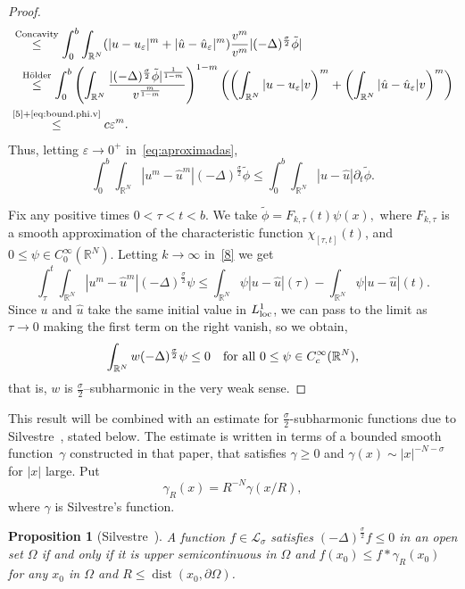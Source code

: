 \documentclass[leqno,12pt]{amsart}
\newtheorem{proposition}[theorem]{Proposition}
\theoremstyle{definition}
\theoremstyle{remark}
\numberwithin{equation}{section}
\begin{document}
\begin{proof}
\begin{align*}
    &\overset{\text{Concavity}}{\le}
    \int_{0}^{b}\int_{\mathbb{R}^N}(|u-u_{\varepsilon}|^m+|\hat{u}-\hat{u}_{\varepsilon}|^m)\frac{v^m}{v^m}|(-\Delta)^{\frac\sigma2}\tilde\phi| \\
    &\hskip6pt\overset{\text{Hölder}}{\le}\int_{0}^{b}\left(\int_{\mathbb{R}^N}\frac{|(-\Delta)^{\frac\sigma2}\tilde\phi|^{\frac{1}{1-m}}}{v^{\frac{m}{1-m}}}\right)^{1-m}
    \left(\left(\int_{\mathbb{R}^N}|u-u_{\varepsilon}|v\right)^m+\left(\int_{\mathbb{R}^N}|\hat{u}-\hat{u}_{\varepsilon}|v\right)^m\right)\\
    &\hskip-2pt\overset{\text{\eqref{5}}+\text{\eqref{eq:bound.phi.v}}}{\le} c\varepsilon^m.
\end{align*}
Thus, letting $\varepsilon\to 0^+$ in~\eqref{eq:aproximadas},
\begin{equation}\label{8}
    \int_{0}^{b}\int_{\mathbb{R}^N}|u^m-\hat{u}^m|(-\Delta)^{\frac\sigma2}\tilde{\phi}\leq \int_{0}^{b}\int_{\mathbb{R}^N}|u-\hat{u}|\partial_t\tilde{\phi}.
\end{equation}

Fix any positive times $0<\tau<t<b$. We take $\tilde{\phi}=F_{k,\tau}(t)\psi(x),$ where $F_{k,\tau}$ is a smooth approximation of the characteristic function $\chi_{[\tau,t]}(t)$, and $0\leq\psi\in C^{\infty}_0(\mathbb{R}^N)$. Letting $k\to\infty$ in~\eqref{8} we get
$$
    \int_{\tau}^{t}\int_{\mathbb{R}^N}|u^m-\hat{u}^m|(-\Delta)^{\frac\sigma2}\psi\leq \int_{\mathbb{R}^N}\psi|u-\hat{u}|(\tau) -\int_{\mathbb{R}^N}\psi|u-\hat{u}|(t).
$$
Since $u$ and $\hat{u}$ take the same initial value in $L^1_{\textup{loc}}$, we can pass to the limit as $\tau\to 0$ making the first term on the right vanish, so we obtain,
$$
 \int_{\mathbb{R}^N}w(-\Delta)^{\frac\sigma2}\psi\leq 0\quad\textup{for all }0\leq\psi\in C^{\infty}_c(\mathbb{R}^N),
$$
that is, $w$ is $\frac{\sigma}{2}$--subharmonic in the very weak sense.
\end{proof}

This result will be combined with an estimate for $\frac\sigma2$-subharmonic functions due to Silvestre~\cite[Proposition 2.19]{silvestre}, stated below. The estimate is written in terms of a bounded smooth function~$\gamma$ constructed in that paper, that satisfies $\gamma\ge0$ and $\gamma(x)\sim |x|^{-N-\sigma}$ for $|x|$ large. Put
$$
 \gamma_R (x) =R^{-N}\gamma(x/R),
$$
where $\gamma$ is Silvestre's function.

\begin{proposition}[Silvestre~\cite{silvestre}]\label{proposilvestre}
    A function $f\in \mathcal{L}_{\sigma}$ satisfies $(-\Delta)^{\frac\sigma2}f\leq0$ in an open set $\Omega$ if and only if it
    is upper semicontinuous in $\Omega$  and $f(x_0)\leq f\ast \gamma_{R}(x_0)$ for any $x_0$ in $\Omega$ and $R\leq \operatorname{dist}(x_0, \partial\Omega)$.
\end{proposition}
\end{document}
